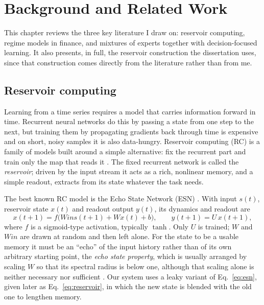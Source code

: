 
\chapter{Background and Related Work}
\label{ch:background}

This chapter reviews the three key literature I draw on: reservoir computing, regime models in finance, and mixtures of experts together with decision-focused learning. It also presents, in full, the reservoir construction the dissertation uses, since that construction comes directly from the literature rather than from me.

\section{Reservoir computing}
\label{sec:bg-reservoir}

Learning from a time series requires a model that carries information forward in time. Recurrent neural networks do this by passing a state from one step to the next, but training them by propagating gradients back through time is expensive and on short, noisy samples it is also data-hungry. Reservoir computing (RC) is a family of models built around a simple alternative: fix the recurrent part and train only the map that reads it \cite{jaeger2001echo,lukosevicius2009reservoir}. The fixed recurrent network is called the \emph{reservoir}; driven by the input stream it acts as a rich, nonlinear memory, and a simple readout, extracts from its state whatever the task needs.

The best known RC model is the Echo State Network (ESN) \cite{jaeger2001echo}. With input $s(t)$, reservoir state $x(t)$ and readout output $y(t)$, its dynamics and readout are
\begin{equation}
  x(t+1) = f\big(Win s(t+1) + W x(t)+b\big), \qquad y(t+1) = U\, x(t+1),
  \label{eq:esn}
\end{equation}
where $f$ is a sigmoid-type activation, typically $\tanh$. Only $U$ is trained; $W$ and $Win$ are drawn at random and then left alone. For the state to be a usable memory it must be an ``echo'' of the input history rather than of its own arbitrary starting point, the \emph{echo state property}, which is usually arranged by scaling $W$ so that its spectral radius is below one, although that scaling alone is neither necessary nor sufficient \cite{rodan2011simple}. Our system uses a leaky variant of Eq.~\ref{eq:esn}, given later as Eq.~\ref{eq:reservoir}, in which the new state is blended with the old one to lengthen memory.

